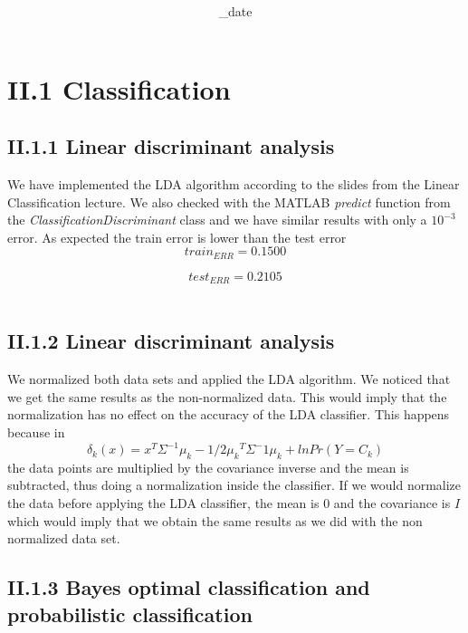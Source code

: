 \documentclass{article}      %
\title{\textbf{\Course}\\\textbf{\Exam}}
\author{\Studentname}
\date{\Sub_date}      %
\begin{document}

\maketitle                   %

\section*{II.1 Classification}
\subsection*{II.1.1 Linear discriminant analysis}

We have implemented the LDA algorithm according to the slides from the Linear Classification lecture. We also checked with the MATLAB \emph{predict} function from the \emph{ClassificationDiscriminant} class and we have similar results with only a $10^{-3}$ error. As expected the train error is lower than the test error\\

\[ 
train_{ERR} = 0.1500 \]

\[ 
test_{ERR} = 0.2105 
\] \\

\subsection*{II.1.2 Linear discriminant analysis}

We normalized both data sets and applied the LDA algorithm. We noticed that we get the same results as the non-normalized data. This would imply that the normalization has no effect on the accuracy of the LDA classifier. This happens because in \[ \delta_k(x) = x^T\Sigma^{-1}\mu_k - 1/2{\mu_k}^T\Sigma^-1\mu_k + ln{Pr( Y = C_k)}\] the data points are multiplied by the covariance inverse and the mean is subtracted, thus doing a normalization inside the classifier. If we would normalize the data before applying the LDA classifier, the mean is 0 and the covariance is $I$ which would imply that we obtain the same results as we did with the non normalized data set.

\subsection*{II.1.3 Bayes optimal classification and probabilistic classification}
\end{document}

